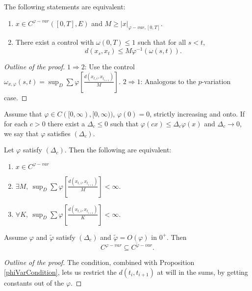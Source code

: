 \begin{proposition}
    The following statements are equivalent:
    \begin{enumerate}
        \item $x \in C^{\varphi-var}([0,T],E)$ and $M \geq |x|_{\varphi-var,[0,T]}.$
        \item There exist a control with $\omega(0,T) \leq 1$ such that for all $s < t$,
        \begin{equation}
            d(x_s,x_t) \leq M \varphi^{-1}(\omega(s,t)).
        \end{equation}
    \end{enumerate}
\end{proposition}
\begin{proof}[Outline of the proof]
    $1 \Rightarrow 2$: Use the control $\omega_{x,\varphi}(s,t) = \sup_D \sum \varphi \left[ \frac{d(x_{t,i}, x_{t_{i+1}} )}{M} \right]$.
    $2 \Rightarrow 1$: Analogous to the $p$-variation case.
\end{proof}

\begin{definition}
    Assume that $\varphi \in C([0,\infty),[0,\infty))$, $\varphi(0)=0$, strictly increasing and onto.
    If for each $c > 0$ there exist a $\Delta_c \le 0$ such that $\varphi(cx) \le \Delta_c \varphi(x)$ and $\Delta_c \rightarrow 0$, we say that $\varphi$ satisfies $(\Delta_c)$.
\end{definition}

\begin{proposition}\label{phiVarCondition}
    Let $\varphi$ satisfy $(\Delta_c)$. Then the following are equivalent:
    \begin{enumerate}
        \item $x \in C^{\varphi-var}$
        \item $\exists M,\ \sup_D \sum \varphi \left[ \frac{d(x_{t,i}, x_{t_{i+1}} )}{M} \right] < \infty$.
        \item $\forall K,\ \sup_D \sum \varphi \left[ \frac{d(x_{t,i}, x_{t_{i+1}} )}{K} \right] < \infty$.
    \end{enumerate}
\end{proposition}

\begin{lemma}
    Assume $\varphi$ and $\tilde{\varphi}$ satisfy $(\Delta_c)$ and $\tilde{\varphi} = O(\varphi)$ in $0^+$.
    Then
    \begin{equation}
        C^{\varphi-var} \subseteq C^{\tilde{\varphi}-var}.
    \end{equation}
\end{lemma}
\begin{proof}[Outline of the proof]
    The condition, combined with Proposition \ref{phiVarCondition}, lets us restrict the $d(t_i,t_{i+1})$ at will in the sums, by getting constants out of the $\varphi$.
\end{proof}

